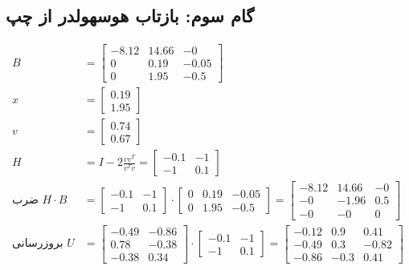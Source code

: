 \subsection*{گام سوم: بازتاب هوسهولدر از چپ }
\begin{align*}
B &= \begin{bmatrix}
-8.12 & 14.66 & -0 \\
 0 & 0.19 & -0.05 \\
 0 & 1.95 & -0.5
\end{bmatrix} \\
x &= \begin{bmatrix}
0.19 \\
1.95
\end{bmatrix} \\
v &= \begin{bmatrix}
0.74 \\
0.67
\end{bmatrix} \\
H &= I - 2 \frac{vv^T}{v^T v} = \begin{bmatrix}
-0.1 & -1 \\
-1 & 0.1
\end{bmatrix} \\
\text{ضرب } H \cdot B &= \begin{bmatrix}
-0.1 & -1 \\
-1 & 0.1
\end{bmatrix} \cdot \begin{bmatrix}
 0 & 0.19 & -0.05 \\
 0 & 1.95 & -0.5
\end{bmatrix} = \begin{bmatrix}
-8.12 & 14.66 & -0 \\
 -0 & -1.96 & 0.5 \\
 -0 & -0 & 0
\end{bmatrix} \\
\text{بروزرسانی } U &= \begin{bmatrix}
-0.49 & -0.86 \\
 0.78 & -0.38 \\
-0.38 & 0.34
\end{bmatrix} \cdot \begin{bmatrix}
-0.1 & -1 \\
-1 & 0.1
\end{bmatrix} = \begin{bmatrix}
-0.12 & 0.9 & 0.41 \\
-0.49 & 0.3 & -0.82 \\
-0.86 & -0.3 & 0.41
\end{bmatrix}
\end{align*}

